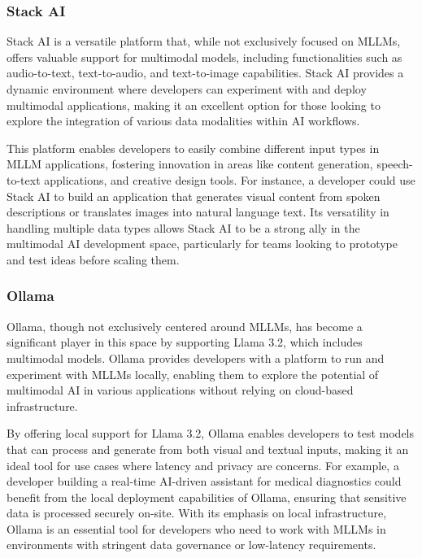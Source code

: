 \subsubsection{Stack AI}

Stack AI is a versatile platform that, while not exclusively focused on MLLMs, offers valuable support for multimodal models, including functionalities such as audio-to-text, text-to-audio, and text-to-image capabilities. 
Stack AI provides a dynamic environment where developers can experiment with and deploy multimodal applications, making it an excellent option for those looking to explore the integration of various data modalities within AI workflows.

This platform enables developers to easily combine different input types in MLLM applications, fostering innovation in areas like content generation, speech-to-text applications, and creative design tools. 
For instance, a developer could use Stack AI to build an application that generates visual content from spoken descriptions or translates images into natural language text. 
Its versatility in handling multiple data types allows Stack AI to be a strong ally in the multimodal AI development space, particularly for teams looking to prototype and test ideas before scaling them.

\subsubsection{Ollama}

Ollama, though not exclusively centered around MLLMs, has become a significant player in this space by supporting Llama 3.2, which includes multimodal models. 
Ollama provides developers with a platform to run and experiment with MLLMs locally, enabling them to explore the potential of multimodal AI in various applications without relying on cloud-based infrastructure.

By offering local support for Llama 3.2, Ollama enables developers to test models that can process and generate from both visual and textual inputs, making it an ideal tool for use cases where latency and privacy are concerns. 
For example, a developer building a real-time AI-driven assistant for medical diagnostics could benefit from the local deployment capabilities of Ollama, ensuring that sensitive data is processed securely on-site. 
With its emphasis on local infrastructure, Ollama is an essential tool for developers who need to work with MLLMs in environments with stringent data governance or low-latency requirements.

